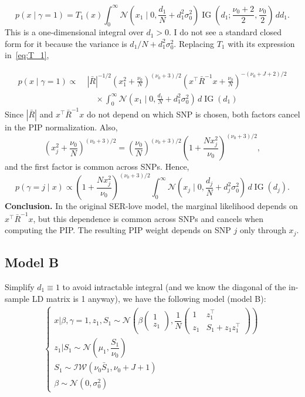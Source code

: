 \documentclass[11pt]{article}
\newcommand{\IG}{\operatorname{IG}}
\newcommand{\Normal}{\mathcal N}
\begin{document}
\[
\boxed{
p(x\mid \gamma=1)
=
T_1(x)
\int_0^\infty
\Normal\left(x_1\mid 0,\frac{d_1}{N}+d_1^2\sigma_0^2\right)
\IG\left(d_1;\frac{\nu_0+2}{2},\frac{\nu_0}{2}\right)\,d d_1
}.
\]
This is a one-dimensional integral over $d_1>0$. I do not see a standard
closed form for it because the variance is $d_1/N+d_1^2\sigma_0^2$. Replacing $T_1$ with its expression in~\eqref{eq:T_1}, 

\[
\begin{aligned}
p(x\mid \gamma=1)
\propto\;& |\bar R|^{-1/2}
\left(x_1^2+\frac{\nu_0}{N}\right)^{(\nu_0+3)/2}
\left(x^\top\bar R^{-1}x+\frac{\nu_0}{N}\right)^{-(\nu_0+J+2)/2} \\
&\quad\times
\int_0^\infty
\Normal\left(x_1\mid 0,\frac{d_1}{N}+d_1^2\sigma_0^2\right)\,d \IG(d_1)
\end{aligned}
\]
Since $|\bar R|$ and $x^\top\bar R^{-1}x$ do not depend on which SNP is chosen,
both factors cancel in the PIP normalization. Also,
\[
\left(x_j^2+\frac{\nu_0}{N}\right)^{(\nu_0+3)/2}
=
\left(\frac{\nu_0}{N}\right)^{(\nu_0+3)/2}
\left(1+\frac{Nx_j^2}{\nu_0}\right)^{(\nu_0+3)/2},
\]
and the first factor is common across SNPs. Hence,
\[
\boxed{
p(\gamma=j\mid x)
\propto
\left(1+\frac{Nx_j^2}{\nu_0}\right)^{(\nu_0+3)/2}
\int_0^\infty
\Normal\left(x_j\mid 0,\frac{d_j}{N}+d_j^2\sigma_0^2\right)\,d \IG(d_j)
}.
\]
\textbf{Conclusion.} In the original SER-love model, the marginal likelihood
depends on $x^\top\bar R^{-1}x$, but this dependence is common across SNPs and
cancels when computing the PIP. The resulting PIP weight depends on SNP $j$
only through $x_j$.

\subsection{Model B} 
Simplify $d_1 \equiv 1$ to avoid intractable integral (and we know the diagonal of the in-sample LD matrix is 1 anyway), we have the following model (model B):
\begin{align}\label{eq:SER-model-B} 
\begin{cases}
x | \beta, \gamma = 1, z_1, S_1 \sim \mathcal{N}\left(\beta 
\begin{pmatrix}
1  \\
z_1
\end{pmatrix}, 
\dfrac{1}{N} \begin{pmatrix}
1 & z_1^\top \\
z_1 & S_1 + z_1 z_1^\top
\end{pmatrix}\right)\\
z_1 | S_1 \sim \mathcal{N}\left(\mu_1, \dfrac{S_1}{\nu_0}\right)\\
S_1 \sim \mathcal{IW}(\nu_0 \bar S_1, \nu_0 + J + 1)\\
\beta \sim \mathcal{N}(0, \sigma_0^2)
\end{cases}
\end{align}
\end{document}
